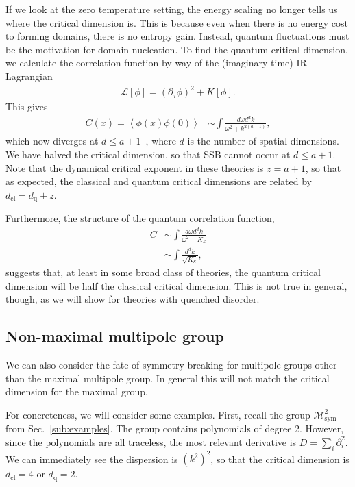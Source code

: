 \documentclass[pra,aps,twocolumn, amsfonts,amsmath,amssymb,nofootinbib,superscriptaddress]{revtex4-2}
\newcommand{\nn}{\nonumber\\}
\newcommand{\cl}{\text{cl}}
\newcommand{\q}{\text{q}}
\begin{document}
If we look at the zero temperature setting, the energy scaling no longer tells us where the critical dimension is. This is because even when there is no energy cost to forming domains, there is no entropy gain. Instead, quantum fluctuations must be the motivation for domain nucleation. To find the quantum critical dimension, we calculate the correlation function by way of the (imaginary-time) IR Lagrangian 
\begin{align}
     \mathcal{L}[\phi] = (\partial_\tau\phi)^2 + K[\phi].
\end{align} 
This gives 
\begin{align}
C(x) = \left\langle \phi(x) \phi(0) \right\rangle &\sim \int \frac{d\omega d^dk}{\omega^2 + k^{2( a + 1 )}},
\end{align}
which now diverges at $d\le a+1$~\cite{Griffin2015}, where $d$ is the number of spatial dimensions. We have halved the critical dimension, so that SSB cannot occur at $d\le a+1$. Note that the dynamical critical exponent in these theories is $z = a+1$, so that as expected, the classical and quantum critical dimensions are related by $d_\text{cl} = d_\text{q} + z$.

Furthermore, the structure of the quantum correlation function,
\begin{align}
C &\sim \int \frac{d\omega d^dk}{\omega^2 + K_k}\nn
&\sim \int \frac{d^dk}{\sqrt{K_k}},
\end{align}
suggests that, at least in some broad class of theories, the quantum critical dimension will be half the classical critical dimension. This is not true in general, though, as we will show for theories with quenched disorder.

\subsection{Non-maximal multipole group} \label{sub:nonmax}

We can also consider the fate of symmetry breaking for multipole groups other than the maximal multipole group. In general this will not match the critical dimension for the maximal group. 

For concreteness, we will consider some examples. First, recall the group $\mathcal{M}^2_\text{sym}$ from Sec.~\ref{sub:examples}. The group contains polynomials of degree 2. However, since the polynomials are all traceless, the most relevant derivative is $D = \sum_i \partial^2_i$.  We can immediately see the dispersion is $(k^2)^2$, so that the critical dimension is $d_\cl = 4$ or $d_\q = 2$.
\end{document}
